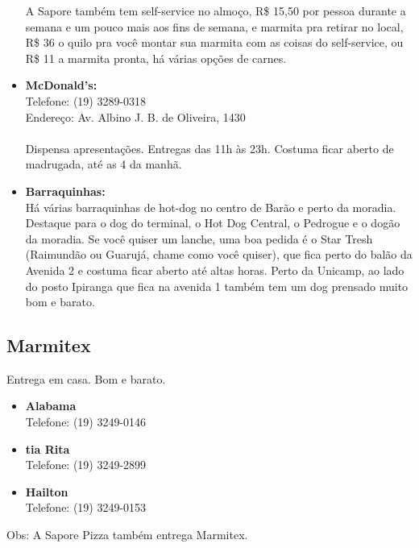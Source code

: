 \begin{itemize}
        A Sapore também tem self-service no almoço, R\$ 15,50 por pessoa durante
        a semana e um pouco mais aos fins de semana, e marmita pra retirar no
        local, R\$ 36 o quilo pra você montar sua marmita com as coisas do
        self-service, ou R\$ 11 a marmita pronta, há várias opções de carnes.

    \item   \textbf{McDonald's:}
        \\Telefone: (19) 3289-0318
        \\Endereço: Av. Albino J. B. de Oliveira, 1430
        \\\\
        Dispensa apresentações. Entregas das 11h às 23h. Costuma ficar aberto de
        madrugada, até as 4 da manhã.

    \item   \textbf{Barraquinhas:}
        \\Há várias barraquinhas de hot-dog no centro de Barão e perto da
        moradia. Destaque para o dog do terminal, o Hot Dog Central, o Pedrogue
        e o dogão da moradia. Se você quiser um lanche, uma boa pedida é o Star
        Tresh (Raimundão ou Guarujá, chame como você quiser), que fica perto do
        balão da Avenida 2 e costuma ficar aberto até altas horas. Perto da
        Unicamp, ao lado do posto Ipiranga que fica na avenida 1 também tem um
        dog prensado muito bom e barato.
\end{itemize}

\subsection{Marmitex}

Entrega em casa. Bom e barato.

\begin{itemize}
    \item   \textbf{Alabama}
        \\Telefone: (19) 3249-0146

    \item   \textbf{tia Rita}
        \\Telefone: (19) 3249-2899

    \item   \textbf{Hailton}
        \\Telefone: (19) 3249-0153
\end{itemize}

Obs: A Sapore Pizza também entrega Marmitex.

